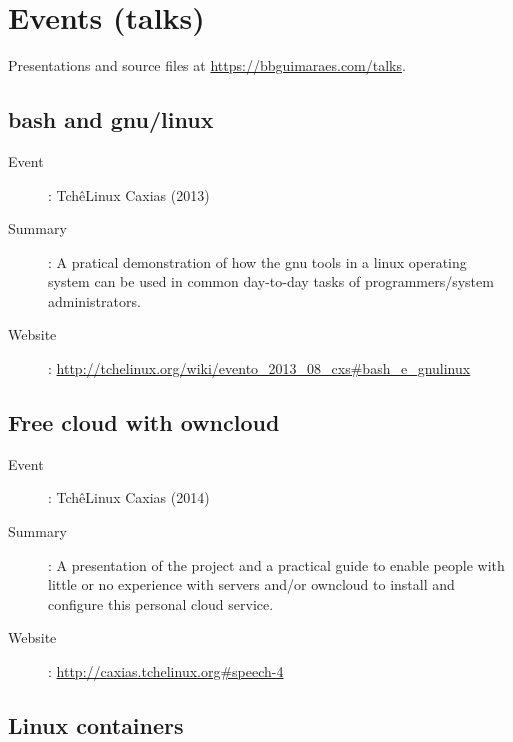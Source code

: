 \section*{Events (talks)}

Presentations and source files at \url{https://bbguimaraes.com/talks}.

\subsection*{bash and gnu/linux}

\begin{description}
    \item[Event]: TchêLinux Caxias (2013)
    \item[Summary]:
        A pratical demonstration of how the gnu tools in a linux operating
        system can be used in common day-to-day tasks of programmers/system
        administrators.
    \item[Website]:
        \url{http://tchelinux.org/wiki/evento_2013_08_cxs#bash_e_gnulinux}
\end{description}

\subsection*{Free cloud with owncloud}

\begin{description}
    \item[Event]: TchêLinux Caxias (2014)
    \item[Summary]:
        A presentation of the project and a practical guide to enable people
        with little or no experience with servers and/or owncloud to install
        and configure this personal cloud service.
    \item[Website]: \url{http://caxias.tchelinux.org#speech-4}
\end{description}

\subsection*{Linux containers}

